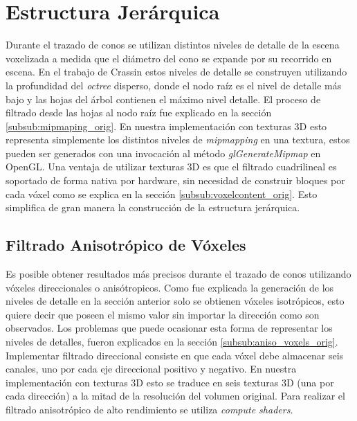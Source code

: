 \section{Estructura Jerárquica} %
\label{sec:estructura_jerarquica}
Durante el trazado de conos se utilizan distintos niveles de detalle de la escena voxelizada a medida que el diámetro del cono se expande por su recorrido en escena. En el trabajo de Crassin estos niveles de detalle se construyen utilizando la profundidad del \emph{octree} disperso, donde el nodo raíz es el nivel de detalle más bajo y las hojas del árbol contienen el máximo nivel detalle. El proceso de filtrado desde las hojas al nodo raíz fue explicado en la sección \ref{subsub:mipmaping_orig}. En nuestra implementación con texturas 3D esto representa simplemente los distintos niveles de \emph{mipmapping} en una textura, estos pueden ser generados con una invocación al método \emph{glGenerateMipmap} en OpenGL. Una ventaja de utilizar texturas 3D es que el filtrado cuadrilineal es soportado de forma nativa por hardware, sin necesidad de construir bloques por cada vóxel como se explica en la sección \ref{subsub:voxelcontent_orig}. Esto simplifica de gran manera la construcción de la estructura jerárquica.

\subsection{Filtrado Anisotrópico de Vóxeles} %
\label{sub:mipmapping_direccioanl}
Es posible obtener resultados más precisos durante el trazado de conos utilizando vóxeles direccionales o anisótropicos. Como fue explicada la generación de los niveles de detalle en la sección anterior solo se obtienen vóxeles isotrópicos, esto quiere decir que poseen el mismo valor sin importar la dirección como son observados. Los problemas que puede ocasionar esta forma de representar los niveles de detalles, fueron explicados en la sección \ref{subsub:aniso_voxels_orig}. Implementar filtrado direccional consiste en que cada vóxel debe almacenar seis canales, uno por cada eje direccional positivo y negativo. En nuestra implementación con texturas 3D esto se traduce en seis texturas 3D (una por cada dirección) a la mitad de la resolución del volumen original. Para realizar el filtrado anisotrópico de alto rendimiento se utiliza \emph{compute shaders}.
